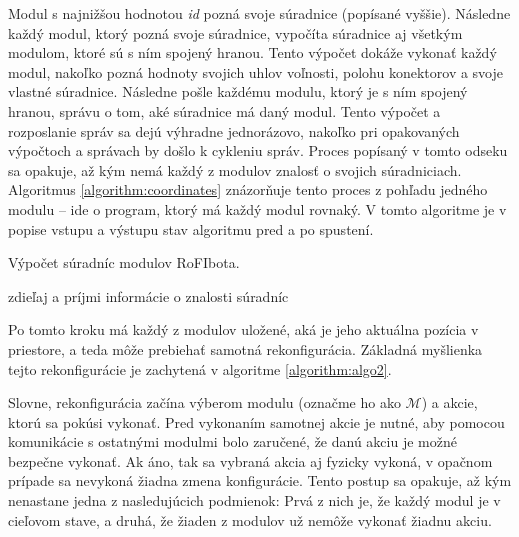 \documentclass[
  digital, %
  oneside, %
  table,   %
  lof,     %
  nolot,     %
]{fithesis3}
\begin{document}
Modul s najnižšou hodnotou \textit{id} pozná svoje súradnice (popísané vyššie). Následne každý modul, ktorý pozná svoje súradnice, vypočíta súradnice aj všetkým modulom, ktoré sú s ním spojený hranou. Tento výpočet dokáže vykonať každý modul, nakoľko pozná hodnoty svojich uhlov voľnosti, polohu konektorov a svoje vlastné súradnice. Následne pošle každému modulu, ktorý je s ním spojený hranou, správu o tom, aké súradnice má daný modul. Tento výpočet a rozposlanie správ sa dejú výhradne jednorázovo, nakoľko pri opakovaných výpočtoch a správach by došlo k cykleniu správ. Proces popísaný v tomto odseku sa opakuje, až kým nemá každý z modulov znalosť o svojich súradniciach. Algoritmus \ref{algorithm:coordinates} znázorňuje tento proces z pohľadu jedného modulu -- ide o program, ktorý má každý modul rovnaký. V tomto algoritme je v popise vstupu a výstupu stav algoritmu pred a po spustení. 

\begin{algorithm}
    \caption{Výpočet súradníc modulov RoFIbota. }
    \label{algorithm:coordinates}
    
    \DontPrintSemicolon
    
    zdieľaj a príjmi informácie o znalosti súradníc\;
\end{algorithm}

Po tomto kroku má každý z modulov uložené, aká je jeho aktuálna pozícia v priestore, a teda môže prebiehať samotná rekonfigurácia. Základná myšlienka tejto rekonfigurácie je zachytená v algoritme \ref{algorithm:algo2}. 

Slovne, rekonfigurácia začína výberom modulu (označme ho ako $\mathcal{M}$) a akcie, ktorú sa pokúsi vykonať. Pred vykonaním samotnej akcie je nutné, aby pomocou komunikácie s ostatnými modulmi bolo zaručené, že danú akciu je možné bezpečne vykonať. Ak áno, tak sa vybraná akcia aj fyzicky vykoná, v opačnom prípade sa nevykoná žiadna zmena konfigurácie. Tento postup sa opakuje, až kým nenastane jedna z nasledujúcich podmienok: Prvá z nich je, že každý modul je v cieľovom stave, a druhá, že žiaden z modulov už nemôže vykonať žiadnu akciu. 
\end{document}
